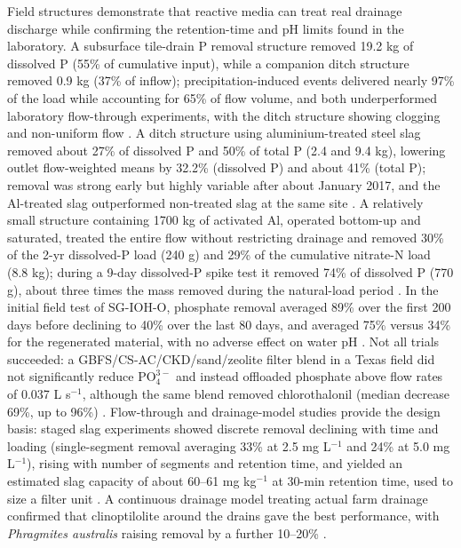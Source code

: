 Field structures demonstrate that reactive media can treat real drainage discharge while confirming the retention-time and pH limits found in the laboratory. A subsurface tile-drain P removal structure removed 19.2 kg of dissolved P (55\% of cumulative input), while a companion ditch structure removed 0.9 kg (37\% of inflow); precipitation-induced events delivered nearly 97\% of the load while accounting for 65\% of flow volume, and both underperformed laboratory flow-through experiments, with the ditch structure showing clogging and non-uniform flow \parencite{Penn2020}. A ditch structure using aluminium-treated steel slag removed about 27\% of dissolved P and 50\% of total P (2.4 and 9.4 kg), lowering outlet flow-weighted means by 32.2\% (dissolved P) and about 41\% (total P); removal was strong early but highly variable after about January 2017, and the Al-treated slag outperformed non-treated slag at the same site \parencite{Shedekar2020}. A relatively small structure containing 1700 kg of activated Al, operated bottom-up and saturated, treated the entire flow without restricting drainage and removed 30\% of the 2-yr dissolved-P load (240 g) and 29\% of the cumulative nitrate-N load (8.8 kg); during a 9-day dissolved-P spike test it removed 74\% of dissolved P (770 g), about three times the mass removed during the natural-load period \parencite{Penn2024}. In the initial field test of SG-IOH-O, phosphate removal averaged 89\% over the first 200 days before declining to 40\% over the last 80 days, and averaged 75\% versus 34\% for the regenerated material, with no adverse effect on water pH \parencite{Allred2017}. Not all trials succeeded: a GBFS/CS-AC/CKD/sand/zeolite filter blend in a Texas field did not significantly reduce $\mathrm{PO_4^{3-}}$ and instead offloaded phosphate above flow rates of 0.037 L s$^{-1}$, although the same blend removed chlorothalonil (median decrease 69\%, up to 96\%) \parencite{Agrawal2011b}. Flow-through and drainage-model studies provide the design basis: staged slag experiments showed discrete removal declining with time and loading (single-segment removal averaging 33\% at 2.5 mg L$^{-1}$ and 24\% at 5.0 mg L$^{-1}$), rising with number of segments and retention time, and yielded an estimated slag capacity of about 60--61 mg kg$^{-1}$ at 30-min retention time, used to size a filter unit \parencite{Wang2020d}. A continuous drainage model treating actual farm drainage confirmed that clinoptilolite around the drains gave the best performance, with \textit{Phragmites australis} raising removal by a further 10--20\% \parencite{Sadeghi2021}.

